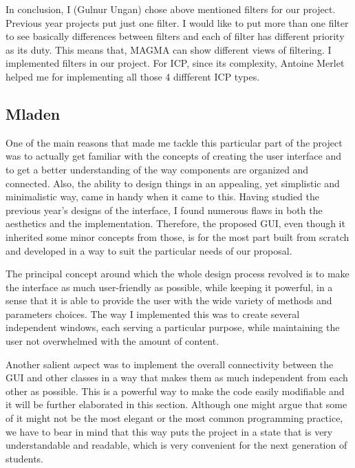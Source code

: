 \documentclass[aps,letterpaper,11pt]{revtex4}
\begin{document}
In conclusion, I (Gulnur Ungan) chose above mentioned filters for our project. Previous year projects put just one filter. I would like to put more than one filter to see basically differences between filters and each of filter has different priority as its duty. This means that, MAGMA can show different views of filtering. I implemented filters in our project. For ICP, since its complexity, Antoine Merlet helped me for implementing all those 4 diffferent ICP types.





\subsection{Mladen}
One of the main reasons that made me tackle this particular part of the project was to actually get familiar with the concepts of creating the user interface and to get a better understanding of the way components are organized and connected. Also, the ability to design things in an appealing, yet simplistic and minimalistic way, came in handy when it came to this. Having studied the previous year’s designs of the interface, I found numerous flaws in both the aesthetics and the implementation. Therefore, the proposed GUI, even though it inherited some minor concepts from those, is for the most part built from scratch and developed in a way to suit the particular needs of our proposal.\par
The principal concept around which the whole design process revolved is to make the interface as much user-friendly as possible, while keeping it powerful, in a sense that it is able to provide the user with the wide variety of methods and parameters choices. The way I implemented this was to create several independent windows, each serving a particular purpose, while maintaining the user not overwhelmed with the amount of content.\par
Another salient aspect was to implement the overall connectivity between the GUI and other classes in a way that makes them as much independent from each other as possible. This is a powerful way to make the code easily modifiable and it will be further elaborated in this section. Although one might argue that some of it might not be the most elegant or the most common programming practice, we have to bear in mind that this way puts the project in a state that is very understandable and readable, which is very convenient for the next generation of students.\par
\end{document}
